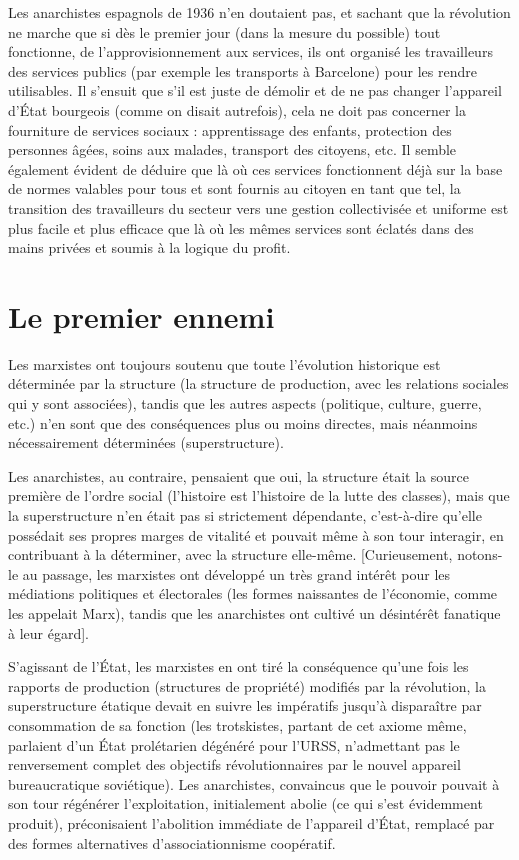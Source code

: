 Les anarchistes espagnols de 1936 n'en doutaient pas, et sachant que la révolution ne marche que si dès le premier jour (dans la mesure du possible) tout fonctionne, de l'approvisionnement aux services, ils ont organisé les travailleurs des services publics (par exemple les transports à Barcelone) pour les rendre utilisables. Il s'ensuit que s'il est juste de démolir et de ne pas changer l'appareil d'État bourgeois (comme on disait autrefois), cela ne doit pas concerner la fourniture de services sociaux : apprentissage des enfants, protection des personnes âgées, soins aux malades, transport des citoyens, etc. Il semble également évident de déduire que là où ces services fonctionnent déjà sur la base de normes valables pour tous et sont fournis au citoyen en tant que tel, la transition des travailleurs du secteur vers une gestion collectivisée et uniforme est plus facile et plus efficace que là où les mêmes services sont éclatés dans des mains privées et soumis à la logique du profit.

\section{Le premier ennemi}

Les marxistes ont toujours soutenu que toute l'évolution historique est déterminée par la structure (la structure de production, avec les relations sociales qui y sont associées), tandis que les autres aspects (politique, culture, guerre, etc.) n'en sont que des conséquences plus ou moins directes, mais néanmoins nécessairement déterminées (superstructure).

Les anarchistes, au contraire, pensaient que oui, la structure était la source première de l'ordre social (l'histoire est l'histoire de la lutte des classes), mais que la superstructure n'en était pas si strictement dépendante, c'est-à-dire qu'elle possédait ses propres marges de vitalité et pouvait même à son tour interagir, en contribuant à la déterminer, avec la structure elle-même. {[}Curieusement, notons-le au passage, les marxistes ont développé un très grand intérêt pour les médiations politiques et électorales (les formes naissantes de l'économie, comme les appelait Marx), tandis que les anarchistes ont cultivé un désintérêt fanatique à leur égard{]}.

S'agissant de l'État, les marxistes en ont tiré la conséquence qu'une fois les rapports de production (structures de propriété) modifiés par la révolution, la superstructure étatique devait en suivre les impératifs jusqu'à disparaître par consommation de sa fonction (les trotskistes, partant de cet axiome même, parlaient d'un État prolétarien dégénéré pour l'URSS, n'admettant pas le renversement complet des objectifs révolutionnaires par le nouvel appareil bureaucratique soviétique). Les anarchistes, convaincus que le pouvoir pouvait à son tour régénérer l'exploitation, initialement abolie (ce qui s'est évidemment produit), préconisaient l'abolition immédiate de l'appareil d'État, remplacé par des formes alternatives d'associationnisme coopératif.

